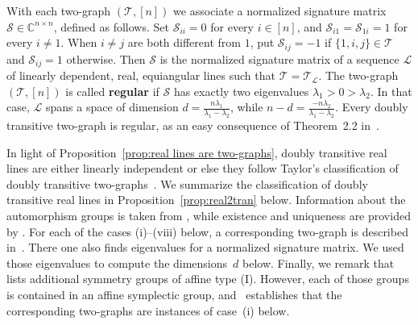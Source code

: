 With each two-graph $(\mathcal{T},[n])$ we associate a normalized signature matrix $\mathcal{S} \in \mathbb{C}^{n\times n}$, defined as follows.
Set $\mathcal{S}_{ii} = 0$ for every $i \in [n]$, and $\mathcal{S}_{i1} = \mathcal{S}_{1i} = 1$ for every $i \neq 1$.
When $i \neq j$ are both different from $1$, put $\mathcal{S}_{ij} = -1$ if $\{ 1 ,i ,j \} \in \mathcal{T}$ and $\mathcal{S}_{ij} = 1$ otherwise.
Then $\mathcal{S}$ is the normalized signature matrix of a sequence $\mathscr{L}$ of linearly dependent, real, equiangular lines such that $\mathcal{T} = \mathcal{T}_{\mathscr{L}}$.
The two-graph $(\mathcal{T},[n])$ is called \textbf{regular} if $\mathcal{S}$ has exactly two eigenvalues $\lambda_1 > 0 > \lambda_2$.
In that case, $\mathscr{L}$ spans a space of dimension $d = \frac{n\lambda_1}{\lambda_1 - \lambda_2}$, while $n-d = \frac{-n\lambda_2}{\lambda_1 - \lambda_2}$.
Every doubly transitive two-graph is regular, as an easy consequence of Theorem~2.2 in~\cite{Taylor:77}.


In light of Proposition~\ref{prop:real lines are two-graphs}, doubly transitive real lines are either linearly independent or else they follow Taylor's classification of doubly transitive two-graphs~\cite{Taylor:92}.
We summarize the classification of doubly transitive real lines in Proposition~\ref{prop:real2tran} below.
Information about the automorphism groups is taken from \cite[Theorem~1]{Taylor:92}, while existence and uniqueness are provided by \cite[Theorem~2]{Taylor:92}.
For each of the cases (i)--(viii) below, a corresponding two-graph is described in~\cite[Section~6]{Taylor:77}.
There one also finds eigenvalues for a normalized signature matrix.
We used those eigenvalues to compute the dimensions~$d$ below.
Finally, we remark that \cite[Theorem~1]{Taylor:92} lists additional symmetry groups of affine type (I).
However, each of those groups is contained in an affine symplectic group, and~\cite[Section~3]{Taylor:92} establishes that the corresponding two-graphs are instances of case~(i) below.

